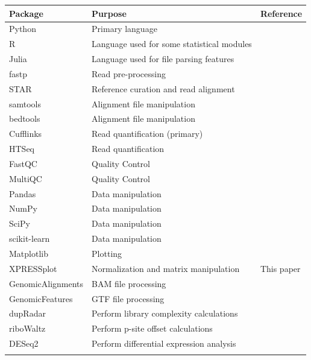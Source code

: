 \documentclass[10pt, oneside]{article}
\begin{document}
\begin{table}[h]
    \centering
{}
\begin{tabular}{p{3cm}p{7.5cm}p{2.4cm}}
 \textbf{Package} & \textbf{Purpose} & \textbf{Reference} \\
 \hline
 Python & Primary language & \\
 \hline
 R & Language used for some statistical modules & \\
 \hline
 Julia & Language used for file parsing features & \\
 \hline
 fastp & Read pre-processing & \cite{fastp} \\
 \hline
 STAR & Reference curation and read alignment & \cite{star} \\
 \hline
 samtools & Alignment file manipulation & \cite{samtools} \\
 \hline
 bedtools & Alignment file manipulation & \cite{bedtools} \\
 \hline
 Cufflinks & Read quantification (primary) & \cite{cufflinks} \\
 \hline
 HTSeq & Read quantification & \cite{htseq} \\
 \hline
 FastQC & Quality Control & \cite{fastqc} \\
 \hline
 MultiQC & Quality Control & \cite{multiqc} \\
 \hline
 Pandas & Data manipulation & \cite{pandas} \\
 \hline
 NumPy & Data manipulation & \cite{numpy1, numpy2} \\
 \hline
 SciPy & Data manipulation & \cite{scipy} \\
 \hline
 scikit-learn & Data manipulation & \cite{sklearn} \\
 \hline
 Matplotlib & Plotting & \cite{matplotlib} \\
 \hline
 XPRESSplot & Normalization and matrix manipulation & This paper \\
 \hline
 GenomicAlignments & BAM file processing & \cite{genomicalign} \\
 \hline
 GenomicFeatures & GTF file processing & \cite{genomicalign} \\
 \hline
 dupRadar & Perform library complexity calculations & \cite{dupradar} \\
 \hline
 riboWaltz & Perform p-site offset calculations & \cite{ribowaltz} \\
 \hline
 DESeq2 & Perform differential expression analysis & \cite{deseq2} \\
 \label{Tab:software_pipe}
\end{tabular}
\end{table}
\end{document}
